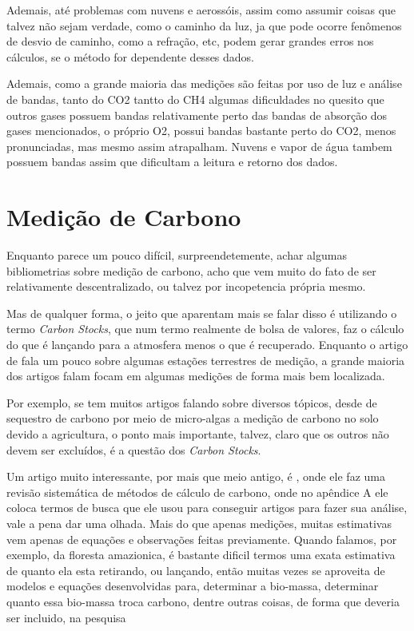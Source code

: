 \documentclass{article}[12pt]
\begin{document}
Ademais, até problemas com nuvens e aerossóis, assim como assumir coisas que talvez não sejam
verdade, como o caminho da luz, ja que pode ocorre fenômenos de desvio de caminho, como a refração,
etc, podem gerar grandes erros nos cálculos, se o método for dependente desses dados. \par


Ademais, como a grande maioria das medições são feitas por uso de luz e análise de bandas, tanto do
CO2 tantto do CH4 algumas dificuldades no quesito que outros gases possuem bandas relativamente
perto das bandas de absorção dos gases mencionados, o próprio O2, possui bandas bastante perto do
CO2, menos pronunciadas, mas mesmo assim atrapalham. Nuvens e vapor de água tambem possuem bandas
assim que dificultam a leitura e retorno dos dados. \par

\section{Medição de Carbono}
Enquanto parece um pouco difícil, surpreendetemente, achar algumas bibliometrias sobre medição de
carbono, acho que vem muito do fato de ser relativamente descentralizado, ou talvez por incopetencia
própria mesmo. \par

Mas de qualquer forma, o jeito que aparentam mais se falar disso é utilizando o termo \emph{Carbon
Stocks}, que num termo realmente de bolsa de valores, faz o cálculo do que é lançando para a
atmosfera menos o que é recuperado. Enquanto o artigo de \cite{Yue2016} fala um pouco sobre algumas
estações terrestres de medição, a grande maioria dos artigos falam focam em algumas medições de
forma mais bem localizada. \par

Por exemplo, se tem muitos artigos falando sobre diversos tópicos, desde de sequestro de carbono por
meio de micro-algas a medição de carbono no solo devido a agricultura, o ponto mais importante,
talvez, claro que os outros não devem ser excluídos, é a questão dos \emph{Carbon Stocks}. \par

Um artigo muito interessante, por mais que meio antigo, é \cite{Petrokofsky2012}, onde ele faz uma
revisão sistemática de métodos de cálculo de carbono, onde no apêndice A ele coloca termos de busca
que ele usou para conseguir artigos para fazer sua análise, vale a pena dar uma olhada.
Mais do que apenas medições, muitas estimativas vem apenas de equações e observações feitas
previamente. Quando falamos, por exemplo, da floresta amazionica, é bastante dificil termos uma
exata estimativa de quanto ela esta retirando, ou lançando, então muitas vezes se aproveita de
modelos e equações desenvolvidas para, determinar a bio-massa, determinar quanto essa bio-massa
troca carbono, dentre outras coisas, de forma que deveria ser incluido, na pesquisa
\end{document}
